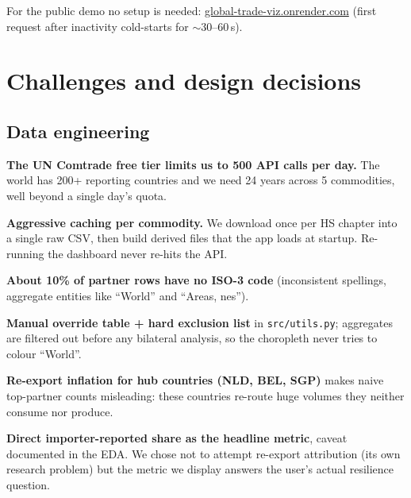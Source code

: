 \documentclass[a4paper,10pt]{article}
\begin{document}
For the public demo no setup is needed:
\href{https://global-trade-viz.onrender.com}{global-trade-viz.onrender.com}
(first request after inactivity cold-starts for $\sim$30--60\,s).

\section{Challenges and design decisions}

\subsection{Data engineering}

\begin{challenge}
\textbf{The UN Comtrade free tier limits us to 500 API calls per day.}
The world has 200+ reporting countries and we need 24 years across 5
commodities, well beyond a single day's quota.
\end{challenge}
\begin{decision}
\textbf{Aggressive caching per commodity.}
We download once per HS chapter into a single raw CSV, then build derived files
that the app loads at startup. Re-running the dashboard never re-hits the API.
\end{decision}

\begin{challenge}
\textbf{About 10\% of partner rows have no ISO-3 code} (inconsistent spellings,
aggregate entities like ``World'' and ``Areas, nes'').
\end{challenge}
\begin{decision}
\textbf{Manual override table + hard exclusion list} in \texttt{src/utils.py};
aggregates are filtered out before any bilateral analysis, so the choropleth
never tries to colour ``World''.
\end{decision}

\begin{challenge}
\textbf{Re-export inflation for hub countries (NLD, BEL, SGP)} makes naive
top-partner counts misleading: these countries re-route huge volumes they
neither consume nor produce.
\end{challenge}
\begin{decision}
\textbf{Direct importer-reported share as the headline metric}, caveat
documented in the EDA. We chose not to attempt re-export attribution (its
own research problem) but the metric we display answers the user's actual
resilience question.
\end{decision}
\end{document}
